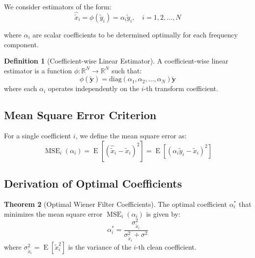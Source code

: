 \documentclass[12pt]{article}
\renewcommand{\vec}[1]{\mathbf{#1}}
\DeclareMathOperator{\E}{E}
\DeclareMathOperator{\MSE}{MSE}
\theoremstyle{definition}
\newtheorem{theorem}{Theorem}[section]
\newtheorem{definition}[theorem]{Definition}
\begin{document}
We consider estimators of the form:
\begin{equation}
    \label{eq:estimator_class}
    \hat{\tilde{x}}_i = \phi(\tilde{y}_i) = \alpha_i \tilde{y}_i, \quad i = 1, 2, \ldots, N
\end{equation}

where $\alpha_i$ are scalar coefficients to be determined optimally for each frequency component.

\begin{definition}[Coefficient-wise Linear Estimator]
    \label{def:coeff_linear}
    A coefficient-wise linear estimator is a function $\phi: \mathbb{R}^N \to \mathbb{R}^N$ such that:
    \begin{equation}
        \phi(\tilde{\vec{y}}) = \text{diag}(\alpha_1, \alpha_2, \ldots, \alpha_N) \tilde{\vec{y}}
    \end{equation}
    where each $\alpha_i$ operates independently on the $i$-th transform coefficient.
\end{definition}

\subsection{Mean Square Error Criterion}
\label{subsec:mse_criterion}

For a single coefficient $i$, we define the mean square error as:
\begin{equation}
    \label{eq:mse_single}
    \MSE_i(\alpha_i) = \E[(\hat{\tilde{x}}_i - \tilde{x}_i)^2] = \E[(\alpha_i \tilde{y}_i - \tilde{x}_i)^2]
\end{equation}


\subsection{Derivation of Optimal Coefficients}
\label{subsec:optimal_derivation}

\begin{theorem}[Optimal Wiener Filter Coefficients]
    \label{thm:optimal_wiener}
    The optimal coefficient $\alpha_i^*$ that minimizes the mean square error $\MSE_i(\alpha_i)$ is given by:
    \begin{equation}
        \label{eq:optimal_alpha}
        \alpha_i^* = \frac{\sigma_{\tilde{x}_i}^2}{\sigma_{\tilde{x}_i}^2 + \sigma^2}
    \end{equation}
    where $\sigma_{\tilde{x}_i}^2 = \E[\tilde{x}_i^2]$ is the variance of the $i$-th clean coefficient.
\end{theorem}
\end{document}
